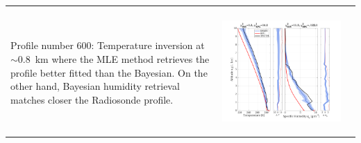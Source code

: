 \documentclass[landscape,paperwidth=1189mm,paperheight=841mm,fontscale=0.4,margin=.7cm]{baposter}
\begin{document}
\begin{poster}
{\begin{tabular}{lcc}
\begin{minipage}{0.35\linewidth}
\begin{center}
	\end{center}
\end{minipage}\\
\vspace{+.5em}
\begin{minipage}{0.18\linewidth}
	\colouredcircle \hspace{2em} Profile number 600: Temperature inversion at $\sim$0.8~km where the MLE method retrieves the profile better fitted than the Bayesian. On the other hand, Bayesian humidity retrieval matches closer the Radiosonde profile.
\end{minipage}
	&
\begin{minipage}{0.35\linewidth}
	\begin{center}             
		\includegraphics[width=1.25\linewidth,height=0.19\textheight]{Profile_600_BAY.png}
	\end{center}
\end{minipage}
&
\begin{minipage}{0.35\linewidth}
	\begin{center}             

\end{center}
\end{minipage}
\end{tabular}}
\end{poster}
\end{document}
